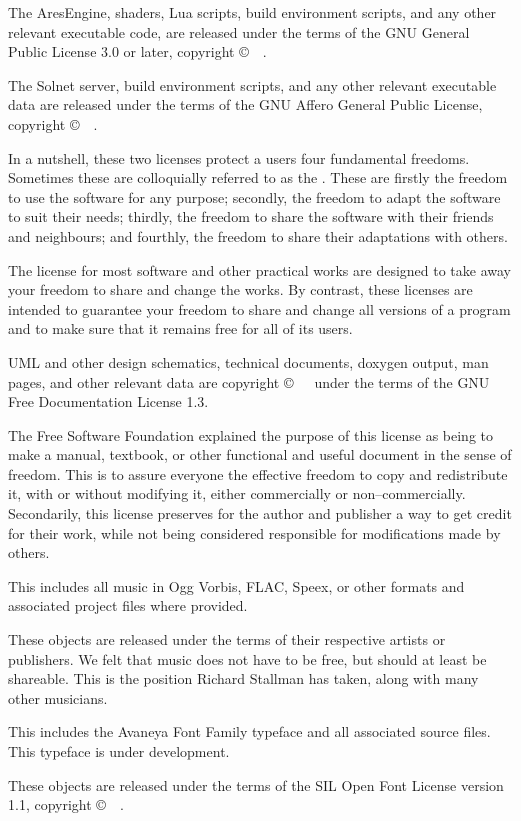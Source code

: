 
The AresEngine, shaders, Lua scripts, build environment scripts, and any other relevant executable code, are released under the terms of the GNU General Public License 3.0 or later, copyright \copyright\ \CopyrightDates\ \CopyrightHolder.

The Solnet server, build environment scripts, and any other relevant executable data are released under the terms of the GNU Affero General Public License, copyright \copyright\ \CopyrightDates\ \CopyrightHolder.

In a nutshell, these two licenses protect a users four fundamental freedoms. Sometimes these are colloquially referred to as the . These are firstly the freedom to use the software for any purpose; secondly, the freedom to adapt the software to suit their needs; thirdly, the freedom to share the software with their friends and neighbours; and fourthly, the freedom to share their adaptations with others. 

The license for most software and other practical works are designed to take away your freedom to share and change the works. By contrast, these licenses are intended to guarantee your freedom to share and change all versions of a program and to make sure that it remains free for all of its users.


UML and other design schematics, technical documents, doxygen output, man pages, and other relevant data are copyright \copyright\ \CopyrightDates\ \CopyrightHolder\ under the terms of the GNU Free Documentation License 1.3.

The Free Software Foundation explained the purpose of this license as being to make a manual, textbook, or other functional and useful document  in the sense of freedom. This is to assure everyone the effective freedom to copy and redistribute it, with or without modifying it, either commercially or non--commercially. Secondarily, this license preserves for the author and publisher a way to get credit for their work, while not being considered responsible for modifications made by others.


This includes all music in Ogg Vorbis, FLAC, Speex, or other formats and associated project files where provided.

These objects are released under the terms of their respective artists or publishers. We felt that music does not have to be free, but should at least be shareable. This is the position Richard Stallman has taken, along with many other musicians.


This includes the Avaneya Font Family typeface and all associated source files. This typeface is under development.

These objects are released under the terms of the SIL Open Font License version 1.1, copyright \copyright\ \CopyrightDates\ \CopyrightHolder.
\stopitemize

\StopChapter

